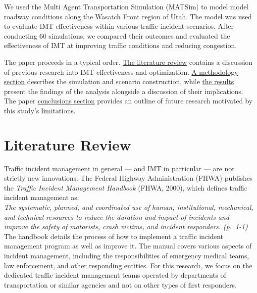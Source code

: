 \documentclass[fancy, oneside, mastersfancy, ms]{byuthesis}
\begin{document}
We used the Multi Agent Transportation Simulation (MATSim) to model
model roadway conditions along the Wasatch Front region of Utah. The
model was used to evaluate IMT effectiveness within various traffic
incident scenarios. After conducting 60 simulations, we compared their
outcomes and evaluated the effectiveness of IMT at improving traffic
conditions and reducing congestion.

The paper proceeds in a typical order.
\protect\hyperlink{sec-literature}{The literature review} contains a
discussion of previous research into IMT effectiveness and optimization.
\protect\hyperlink{sec-methods}{A methodology section} describes the
simulation and scenario construction, while
\protect\hyperlink{sec-results}{the results} present the findings of the
analysis alongside a discussion of their implications. The paper
\protect\hyperlink{sec-conclusions}{conclusions section} provides an
outline of future research motivated by this study's limitations.


\hypertarget{sec-literature}{%
\chapter{Literature Review}\label{sec-literature}}

Traffic incident management in general --- and IMT in particular --- are
not strictly new innovations. The Federal Highway Administration (FHWA)
publishes the \emph{Traffic Incident Management Handbook} (FHWA, 2000),
which defines traffic incident management as:\\
\emph{The systematic, planned, and coordinated use of human,
institutional, mechanical, and technical resources to reduce the
duration and impact of incidents and improve the safety of motorists,
crash victims, and incident responders. (p.~1-1)}\\
The handbook details the process of how to implement a traffic incident
management program as well as improve it. The manual covers various
aspects of incident management, including the responsibilities of
emergency medical teams, law enforcement, and other responding entities.
For this research, we focus on the dedicated traffic incident management
teams operated by departments of transportation or similar agencies and
not on other types of first responders.
\end{document}
